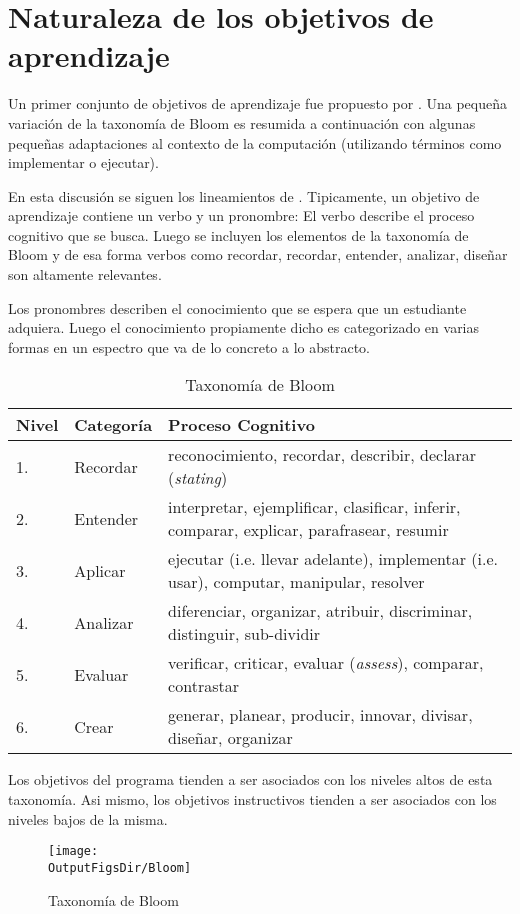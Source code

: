 \section{Naturaleza de los objetivos de aprendizaje}
Un primer conjunto de objetivos de aprendizaje fue propuesto por \cite{Bloom56Taxonomy}. 
Una pequeña variación de la taxonomía de Bloom es resumida a continuación con algunas 
pequeñas adaptaciones al contexto de la computación (utilizando términos como implementar o ejecutar).

En esta discusión se siguen los lineamientos de \cite{Anderson2001Bloom}. 
Tipicamente, un objetivo de aprendizaje contiene un verbo y un pronombre:
El verbo describe el proceso cognitivo que se busca. Luego se incluyen los 
elementos de la taxonomía de Bloom y de esa forma verbos como 
recordar, recordar, entender, analizar, diseñar son altamente relevantes.

Los pronombres describen el conocimiento que se espera que un estudiante adquiera. Luego el conocimiento 
propiamente dicho es categorizado en varias formas en un espectro que va de lo concreto a lo abstracto.

\begin{center}
\begin{table}[h!]
\begin{tabularx}{\textwidth}{|l|l|X|}\hline
\textbf{Nivel} & \textbf{Categoría}      & \textbf{Proceso Cognitivo} \\ \hline
1.     & Recordar 	& reconocimiento, recordar, describir, declarar (\textit{stating}) \\ \hline
2.     & Entender 	& interpretar, ejemplificar, clasificar, inferir, comparar, explicar, parafrasear, resumir \\ \hline
3.     & Aplicar        & ejecutar (i.e. llevar adelante), implementar (i.e. usar), computar, manipular, resolver \\ \hline
4.     & Analizar      	& diferenciar, organizar, atribuir, discriminar, distinguir, sub-dividir \\ \hline 
5.     & Evaluar     	& verificar, criticar, evaluar (\textit{assess}), comparar, contrastar \\ \hline
6.     & Crear       	& generar, planear, producir, innovar, divisar, diseñar, organizar \\ \hline
\end{tabularx}
\label{tab:BloomTaxonomy}
\caption{Taxonomía de Bloom}
\end{table}
\end{center}

Los objetivos del programa tienden a ser asociados con los niveles altos de esta taxonomía. Asi mismo, 
los objetivos instructivos tienden a ser asociados con los niveles bajos de la misma.

\begin{figure}[h!]
\texttt{[image: \\OutputFigsDir/Bloom]}
\label{fig:BloomTaxonomy}
\caption{Taxonomía de Bloom}
\end{figure} 
